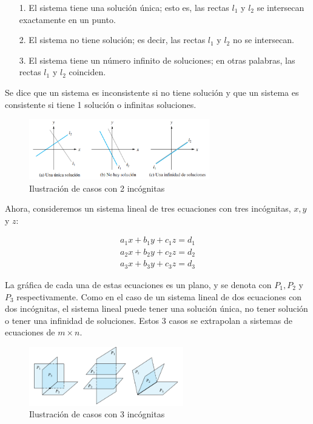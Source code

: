 \documentclass{article}
\begin{document}
\begin{tcolorbox}[colback=blue!10!white,colframe=blue!60!black,title=Posibles casos]
    \begin{itemize}
        \item[1.] El sistema tiene una solución única; esto es, las rectas $l_1$ y $l_2$ se intersecan exactamente en un punto.
        \item[2.] El sistema no tiene solución; es decir, las rectas $l_1$ y $l_2$ no se intersecan.
        \item[3.] El sistema tiene un número infinito de soluciones; en otras palabras, las rectas $l_1$ y $l_2$ coinciden.
    \end{itemize}
\end{tcolorbox}

Se dice que un sistema es inconsistente si no tiene solución y que un sistema es consistente si tiene 1 solución o infinitas soluciones.

\begin{figure}[ht]
  \centerline{\includegraphics[width=0.7\textwidth]{image5.png}}
  \caption{Ilustración de casos con 2 incógnitas}
  \label{}
\end{figure}

Ahora, consideremos un sistema lineal de tres ecuaciones con tres incógnitas, $x, y$ y $z$:

$$\begin{matrix}
    a_1x + b_1y + c_1z =d_1\\ 
    a_2x + b_2y + c_2z =d_2\\ 
    a_3x + b_3y + c_3z =d_3
\end{matrix}$$

La gráfica de cada una de estas ecuaciones es un plano, y se denota con $P_1, P_2$ y $P_3$ respectivamente. Como en el caso de un sistema lineal de dos ecuaciones con dos incógnitas, el sistema lineal puede tener una solución única, no tener solución o tener una infinidad de soluciones. Estos 3 casos se extrapolan a sistemas de ecuaciones de $m \times n$.

\begin{figure}[ht]
  \centerline{\includegraphics[width=0.6\textwidth]{image4.png}}
  \caption{Ilustración de casos con 3 incógnitas}
  \label{}
\end{figure}
\end{document}
